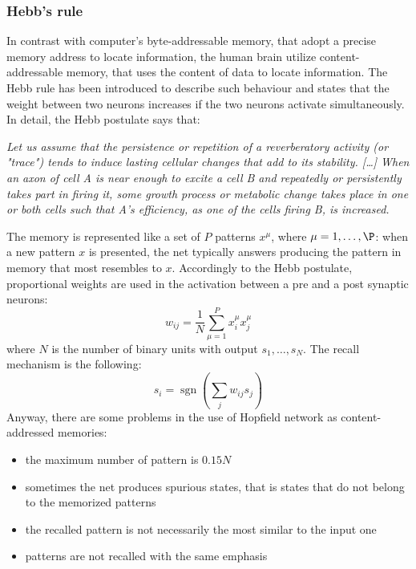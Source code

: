 \documentclass[letterpaper,twocolumn,10pt]{article}
\DeclareMathOperator*{\sign}{sgn}
\begin{document}
\subsubsection{Hebb's rule}
In contrast with computer's byte-addressable memory, that adopt a precise memory address to locate information, the human brain utilize content-addressable memory, that uses the content of data to locate information. The Hebb rule has been introduced to describe such behaviour and states that the weight between two neurons increases if the two neurons activate simultaneously. In detail, the Hebb postulate says that: 
\begin{center}
\emph{Let us assume that the persistence or repetition of a reverberatory activity (or "trace") tends to induce lasting cellular changes that add to its stability. [\ldots] When an axon of cell A is near enough to excite a cell B and repeatedly or persistently takes part in firing it, some growth process or metabolic change takes place in one or both cells such that A's efficiency, as one of the cells firing B, is increased. }\cite{Hebb49}
\end{center}
The memory is represented like a set of $P$ patterns $x^\mu$, where $\mu = 1,\ldots,\P$: when a new pattern $x$ is presented, the net typically answers producing the pattern in memory that most resembles to $x$. Accordingly to the Hebb postulate, proportional weights are used in the activation between a pre and a post synaptic neurons:
\begin{displaymath}
	w_{ij} = \frac{1}{N} \sum_{\mu = 1}^P x_i^\mu x_j^\mu
\end{displaymath}
where $N$ is the number of binary units with output $s_1,\ldots,s_N$. The recall mechanism is the following:
\begin{displaymath}
	s_i = \sign\left(\sum_j w_{ij} s_j \right)
\end{displaymath}
Anyway, there are some problems in the use of Hopfield network as content-addressed memories:
\begin{itemize}
\item the maximum number of pattern is $0.15N$
\item sometimes the net produces spurious states, that is states that do not belong to the memorized patterns
\item the recalled pattern is not necessarily the most similar to the input one
\item patterns are not recalled with the same emphasis
\end{itemize}
\end{document}
